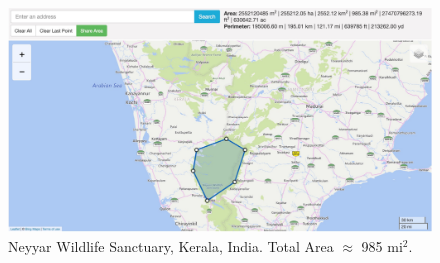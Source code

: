 \begin{figure}[h!]
    \centering
    \includegraphics[width=\columnwidth]{figures/NeyyarArea.pdf}
    \caption{Neyyar Wildlife Sanctuary, Kerala, India. Total Area $\approx$ 985 mi$^2$.}
    \label{fig:neyyar}
\end{figure}